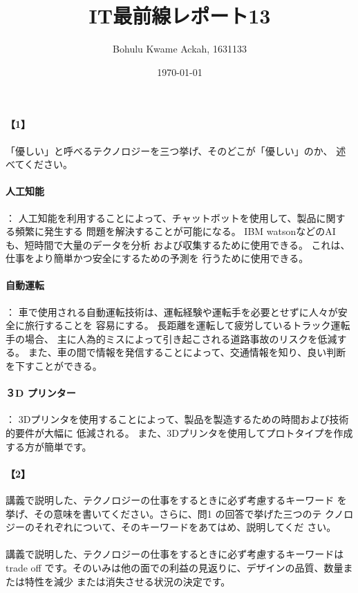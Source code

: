 \documentclass[20 pts]{article}
\title{IT最前線レポート13}
\author{Bohulu Kwame Ackah, 1631133}
\date{\today}
\begin{document}
\maketitle

\newpage
\paragraph{【1】}「優しい」と呼べるテクノロジーを三つ挙げ、そのどこが「優しい」のか、
述べてください。\\

\paragraph{人工知能}：
人工知能を利用することによって、チャットボットを使用して、製品に関する頻繁に発生する
問題を解決することが可能になる。 IBM watsonなどのAIも、短時間で大量のデータを分析
および収集するために使用できる。 これは、仕事をより簡単かつ安全にするための予測を
行うために使用できる。
\paragraph{自動運転}：
車で使用される自動運転技術は、運転経験や運転手を必要とせずに人々が安全に旅行することを
容易にする。 長距離を運転して疲労しているトラック運転手の場合、
主に人為的ミスによって引き起こされる道路事故のリスクを低減する。 
また、車の間で情報を発信することによって、交通情報を知り、良い判断を下すことができる。
　　　　　　　　　
\paragraph{３D プリンター}：
3Dプリンタを使用することによって、製品を製造するための時間および技術的要件が大幅に
低減される。 また、3Dプリンタを使用してプロトタイプを作成する方が簡単です。




\paragraph{【2】}講義で説明した、テクノロジーの仕事をするときに必ず考慮するキーワード
を挙げ、その意味を書いてください。さらに、問1 の回答で挙げた三つのテ
クノロジーのそれぞれについて、そのキーワードをあてはめ、説明してくだ
さい。\\


\paragraph{}講義で説明した、テクノロジーの仕事をするときに必ず考慮するキーワードは
trade off
です。そのいみは他の面での利益の見返りに、デザインの品質、数量または特性を減少
または消失させる状況の決定です。
\end{document}
